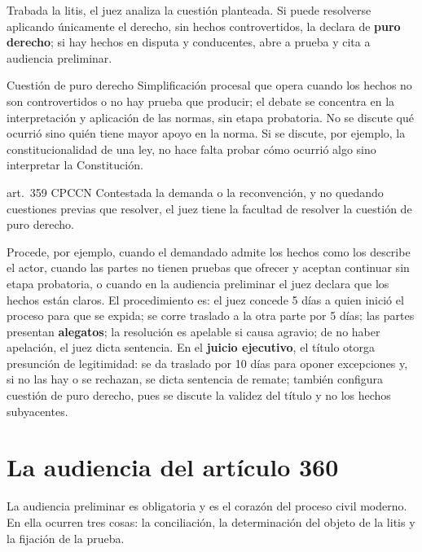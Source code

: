 \documentclass[12pt,oneside]{book}
\begin{document}
Trabada la litis, el juez analiza la cuestión planteada. Si puede resolverse aplicando únicamente el derecho, sin hechos controvertidos, la declara de \textbf{puro derecho}; si hay hechos en disputa y conducentes, abre a prueba y cita a audiencia preliminar.

\begin{definicion}{Cuestión de puro derecho}
Simplificación procesal que opera cuando los hechos no son controvertidos o no hay prueba que producir; el debate se concentra en la interpretación y aplicación de las normas, sin etapa probatoria. No se discute qué ocurrió sino quién tiene mayor apoyo en la norma. Si se discute, por ejemplo, la constitucionalidad de una ley, no hace falta probar cómo ocurrió algo sino interpretar la Constitución.
\end{definicion}

\begin{regla}{art.~359 CPCCN}
Contestada la demanda o la reconvención, y no quedando cuestiones previas que resolver, el juez tiene la facultad de resolver la cuestión de puro derecho.
\end{regla}

Procede, por ejemplo, cuando el demandado admite los hechos como los describe el actor, cuando las partes no tienen pruebas que ofrecer y aceptan continuar sin etapa probatoria, o cuando en la audiencia preliminar el juez declara que los hechos están claros. El procedimiento es: el juez concede 5 días a quien inició el proceso para que se expida; se corre traslado a la otra parte por 5 días; las partes presentan \textbf{alegatos}; la resolución es apelable si causa agravio; de no haber apelación, el juez dicta sentencia. En el \textbf{juicio ejecutivo}, el título otorga presunción de legitimidad: se da traslado por 10 días para oponer excepciones y, si no las hay o se rechazan, se dicta sentencia de remate; también configura cuestión de puro derecho, pues se discute la validez del título y no los hechos subyacentes.

\section{La audiencia del artículo 360}

La audiencia preliminar es obligatoria y es el corazón del proceso civil moderno. En ella ocurren tres cosas: la conciliación, la determinación del objeto de la litis y la fijación de la prueba.
\end{document}
